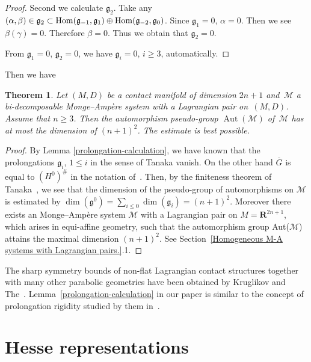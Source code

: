 \documentclass[pdftex]{sigma}
\newtheorem{Th}{Theorem}[section]
\begin{document}
\begin{proof}
Second we calculate ${\mathfrak g}_2$. Take any $(\alpha, \beta) \in {\mathfrak g}_2 \subset
{\rm Hom}({\mathfrak g}_{-1}, {\mathfrak g}_{1})\oplus
{\rm Hom}({\mathfrak g}_{-2}, {\mathfrak g}_{0})$.
Since ${\mathfrak g}_{1} = 0$, $\alpha = 0$. Then we see $\beta(\gamma) = 0$. Therefore $\beta = 0$.
Thus we obtain that ${\mathfrak g}_{2} = 0$.

From ${\mathfrak g}_{1} = 0$, ${\mathfrak g}_{2} = 0$, we have ${\mathfrak g}_{i} = 0$, $i \geq 3$, automatically.
\end{proof}

Then we have

\begin{Th}
\label{maximal symmetry}
Let $(M, D)$ be a contact manifold of dimension $2n+1$
and~$\mathcal{M}$
a bi-decomposable Monge--Amp{\`e}re system
with a Lagrangian pair on~$(M,D)$.
Assume that $n \geq 3$.
Then the automorphism pseudo-group $\operatorname{Aut}(\mathcal{M})$
of~$\mathcal{M}$ has
at most the dimension of
$(n+1)^2$. The estimate is best possible.
\end{Th}

\begin{proof}
By Lemma \ref{prolongation-calculation},
we have known that the prolongations ${\mathfrak g}_i$, $1 \leq i$ in the sense of Tanaka vanish.
On the other hand $\overline{G}$ is equal to $(H^0)^{\#}$ in the notation of~\cite{Tan}.
Then, by the f\/initeness theorem of Tanaka~\cite[Corollary~2]{Tan}, we see that
the dimension of the pseudo-group of automorphisms on ${\mathcal M}$ is estimated by
$\dim({\mathfrak g^0}) = \sum\limits_{i \leq 0} \dim({\mathfrak g}_i) = (n+1)^2$.
Moreover there exists an Monge--Amp{\`e}re system $\mathcal{M}$ with a Lagrangian pair on
$M = {\mathbf{R}}^{2n+1}$, which arises in equi-af\/f\/ine geometry, such that
the automorphism group {\rm Aut}($\mathcal{M}$) attains the maximal dimension $(n+1)^2$.
See Section~\ref{Homogeneous M-A systems with Lagrangian pairs.}.1.
\end{proof}

\begin{Rem}
The sharp symmetry bounds of non-f\/lat Lagrangian contact structures together with many other parabolic
geometries have been obtained by Kruglikov and The~\cite{K-T}.
Lemma~\ref{prolongation-calculation} in our paper
is similar to the concept of prolongation rigidity studied by them in~\cite{K-T}.
\end{Rem}


\section{Hesse representations}
\label{Hesse representations.}
\end{document}
